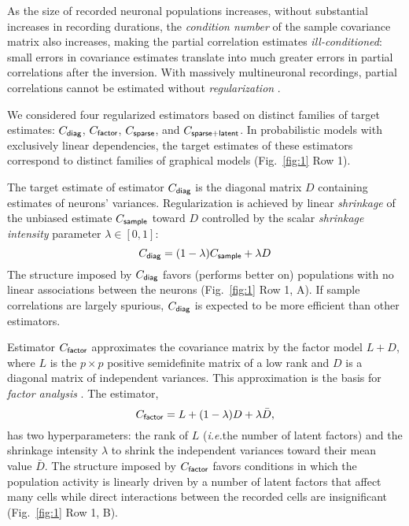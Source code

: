 {As the size of recorded neuronal populations increases, without substantial increases in recording durations, the \emph{condition number} of the sample covariance matrix also increases, making the partial correlation estimates \emph{ill-conditioned}: small errors in covariance estimates translate into much greater errors in partial correlations after the inversion. With massively multineuronal recordings, partial correlations cannot be estimated without \emph{regularization} \cite{Ledoit:2004,Schafer:2005}.

We considered four regularized estimators based on distinct families of target estimates: $C_{\sf diag}$, $C_{\sf factor}$, $C_{\sf sparse}$, and $C_{\sf sparse+latent}$. In probabilistic models with exclusively linear dependencies, the target estimates of these estimators correspond to distinct families of graphical models (Fig.~\ref{fig:1} Row 1).

The target estimate of estimator $C_{\sf diag}$ is the diagonal matrix $D$ containing estimates of neurons' variances. Regularization is achieved by linear \emph{shrinkage} of the unbiased estimate $C_{\sf sample}$ toward $D$ controlled by the scalar \emph{shrinkage intensity} parameter $\lambda \in [0, 1]$:
\begin{equation}\label{eq:c-diag}
C_{\sf diag} = (1-\lambda) C_{\sf sample} + \lambda D
\end{equation}
The structure imposed by $C_{\sf diag}$ favors (performs better  on) populations   with no linear associations between the neurons (Fig.~\ref{fig:1} Row 1, A).  If sample correlations are largely spurious, $C_{\sf diag}$ is expected to be more efficient than other estimators.

Estimator $C_{\sf factor}$ approximates the covariance matrix by the factor model $L + D$, where $L$ is the $p\times p$ positive semidefinite matrix of a low rank and $D$ is a diagonal matrix of independent variances. This approximation is the basis for \emph{factor analysis} \cite{Anderson:2003}. The estimator,
\begin{equation}\label{eq:c-factor}
C_{\sf factor} = L + (1-\lambda)D + \lambda \bar D,
\end{equation}
has two hyperparameters: the rank of $L$ (\emph{i.e.}\;the number of latent factors) and the shrinkage intensity $\lambda$ to shrink the independent variances toward their mean value $\bar D$. The structure imposed by $C_{\sf factor}$ favors conditions in which the population activity is linearly driven by a number of latent factors that affect many cells while direct interactions between the recorded cells are insignificant (Fig.~\ref{fig:1} Row 1, B).

}
